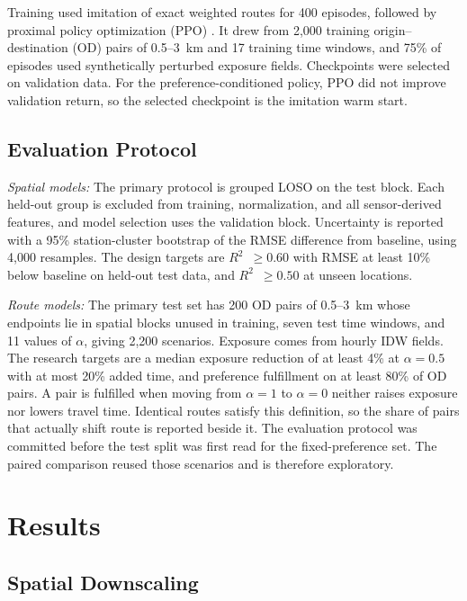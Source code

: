 \documentclass[conference]{IEEEtran}
\newcommand{\rsq}{$R^2$}
\begin{document}
Training used imitation of exact weighted routes for 400 episodes, followed by proximal policy optimization (PPO) \cite{schulman2017}. It drew from 2,000 training origin--destination (OD) pairs of 0.5--3~km and 17 training time windows, and 75\% of episodes used synthetically perturbed exposure fields. Checkpoints were selected on validation data. For the preference-conditioned policy, PPO did not improve validation return, so the selected checkpoint is the imitation warm start.

\subsection{Evaluation Protocol}

\textit{Spatial models:} The primary protocol is grouped LOSO on the test block. Each held-out group is excluded from training, normalization, and all sensor-derived features, and model selection uses the validation block. Uncertainty is reported with a 95\% station-cluster bootstrap \cite{cameron2008} of the RMSE difference from baseline, using 4,000 resamples. The design targets are \rsq{}~$\geq0.60$ with RMSE at least 10\% below baseline on held-out test data, and \rsq{}~$\geq0.50$ at unseen locations.

\textit{Route models:} The primary test set has 200 OD pairs of 0.5--3~km whose endpoints lie in spatial blocks unused in training, seven test time windows, and 11 values of $\alpha$, giving 2,200 scenarios. Exposure comes from hourly IDW fields. The research targets are a median exposure reduction of at least 4\% at $\alpha=0.5$ with at most 20\% added time, and preference fulfillment on at least 80\% of OD pairs. A pair is fulfilled when moving from $\alpha=1$ to $\alpha=0$ neither raises exposure nor lowers travel time. Identical routes satisfy this definition, so the share of pairs that actually shift route is reported beside it. The evaluation protocol was committed before the test split was first read for the fixed-preference set. The paired comparison reused those scenarios and is therefore exploratory.

\section{Results}

\subsection{Spatial Downscaling}
\end{document}
